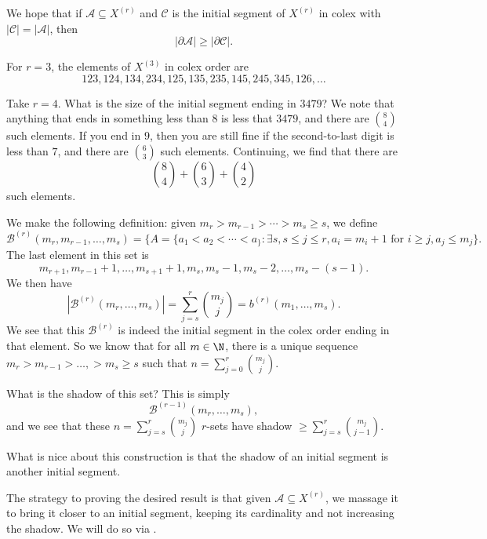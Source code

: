 \documentclass[a4paper]{article}
\begin{document}
We hope that if $\mathcal{A} \subseteq X^{(r)}$ and $\mathcal{C}$ is the initial segment of $X^{(r)}$ in colex with $|\mathcal{C}| = |\mathcal{A}|$, then
\[
  |\partial \mathcal{A}| \geq |\partial \mathcal{C}|.
\]
\begin{eg}
  For $r = 3$, the elements of $X^{(3)}$ in colex order are
  \[
    123, 124, 134, 234, 125, 135, 235, 145, 245, 345, 126,\ldots
  \]
\end{eg}

\begin{eg}
  Take $r = 4$. What is the size of the initial segment ending in $3479$? We note that anything that ends in something less than $8$ is less that $3479$, and there are $\binom{8}{4}$ such elements. If you end in $9$, then you are still fine if the second-to-last digit is less than $7$, and there are $\binom{6}{3}$ such elements. Continuing, we find that there are 
  \[
    \binom{8}{4} + \binom{6}{3} + \binom{4}{2}
  \]
  such elements.
\end{eg}

We make the following definition: given $m_r > m_{r - 1} > \cdots > m_s \geq s$, we define
\[
  \mathcal{B}^{(r)} (m_r, m_{r - 1}, \ldots, m_s) = \{A = \{a_1 < a_2 < \cdots < a_\}: \exists s, s \leq j \leq r, a_i = m_i + 1 \text{ for }i \geq j, a_j \leq m_j\}.
\]
The last element in this set is
\[
  m_{r + 1}, m_{r - 1} + 1, \ldots, m_{s + 1} + 1, m_s, m_s - 1, m_s - 2, \ldots, m_s - (s - 1).
\]
We then have
\[
  |\mathcal{B}^{(r)}(m_r, \ldots, m_s)| = \sum_{j = s}^r \binom{m_j}{j} = b^{(r)} (m_1, \ldots, m_s).
\]
We see that this $\mathcal{B}^{(r)}$ is indeed the initial segment in the colex order ending in that element. So we know that for all $m \in \N$, there is a unique sequence $m_r > m_{r - 1} > \ldots, > m_s \geq s$ such that $n = \sum_{j = 0}^r \binom{m_j}{j}$.

What is the shadow of this set? This is simply
\[
  \mathcal{B}^{(r - 1)} (m_r, \ldots, m_s),
\]
and we see that these $n = \sum_{j = s}^r \binom{m_j}{j}$ $r$-sets have shadow $\geq \sum_{j = s}^r \binom{m_j}{j - 1}$.

What is nice about this construction is that the shadow of an initial segment is another initial segment.

The strategy to proving the desired result is that given $\mathcal{A} \subseteq X^{(r)}$, we massage it to bring it closer to an initial segment, keeping its cardinality and not increasing the shadow. We will do so via .
\end{document}
